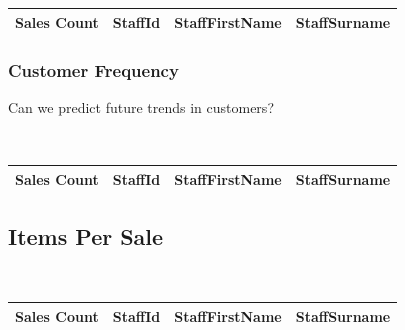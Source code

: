 \documentclass{article}
\begin{document}
                \begin{table}[H]
                    \centering
                    \begin{tabular}{|l|l|l|l|}
                    \hline
                    Sales Count & StaffId & StaffFirstName & StaffSurname \\ \hline
                    \end{tabular}
                    \end{table}

                \subsubsection{Customer Frequency}
                    Can we predict future trends in customers? 

                    \begin{lstlisting}
                        
                    \end{lstlisting}

                    \begin{table}[H]
                        \centering
                        \begin{tabular}{|l|l|l|l|}
                        \hline
                        Sales Count & StaffId & StaffFirstName & StaffSurname \\ \hline
                        \end{tabular}
                        \end{table}
                    
            \subsection{Items Per Sale}

            \begin{lstlisting}
                
            \end{lstlisting}

            \begin{table}[H]
                \centering
                \begin{tabular}{|l|l|l|l|}
                \hline
                Sales Count & StaffId & StaffFirstName & StaffSurname \\ \hline
                \end{tabular}
                \end{table}
\end{document}
